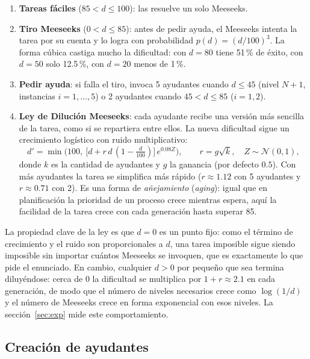 \documentclass[11pt,letterpaper]{article}
\makeatletter
\newcommand{\codigo}[2]{%
  \edef\lin{\csname line@#1\endcsname}%
  }
\makeatother
\begin{document}
\begin{enumerate}[leftmargin=1.5em]
\item \textbf{Tareas fáciles} ($85<d\le100$): las resuelve un solo Meeseeks.
\item \textbf{Tiro Meeseeks} ($0<d\le85$): antes de pedir ayuda, el Meeseeks intenta la
  tarea por su cuenta y lo logra con probabilidad $p(d)=(d/100)^3$. La forma cúbica castiga
  mucho la dificultad: con $d=80$ tiene 51\,\% de éxito, con $d=50$ solo 12.5\,\%, con
  $d=20$ menos de 1\,\%.
\item \textbf{Pedir ayuda}: si falla el tiro, invoca 5 ayudantes cuando $d\le45$ (nivel
  $N+1$, instancias $i=1,\dots,5$) o 2 ayudantes cuando $45<d\le85$ ($i=1,2$).
\item \textbf{Ley de Dilución Meeseeks}: cada ayudante recibe una versión más sencilla de
  la tarea, como si se repartiera entre ellos. La nueva dificultad sigue un crecimiento
  logístico con ruido multiplicativo:
  \[
    d' = \min\!\Big(100,\ \big[d + r\,d\,(1-\tfrac{d}{100})\big]\,e^{0.08Z}\Big),
    \qquad r = g\sqrt{k},\quad Z\sim\mathcal{N}(0,1),
  \]
  donde $k$ es la cantidad de ayudantes y $g$ la ganancia (por defecto $0.5$). Con más
  ayudantes la tarea se simplifica más rápido ($r\approx1.12$ con 5 ayudantes y
  $r\approx0.71$ con 2). Es una forma de \emph{añejamiento} (\emph{aging}): igual que en
  planificación la prioridad de un proceso crece mientras espera, aquí la facilidad de la
  tarea crece con cada generación hasta superar 85.
\end{enumerate}

La propiedad clave de la ley es que $d=0$ es un punto fijo: como el término de crecimiento
y el ruido son proporcionales a $d$, una tarea imposible sigue siendo imposible sin
importar cuántos Meeseeks se invoquen, que es exactamente lo que pide el enunciado. En
cambio, cualquier $d>0$ por pequeño que sea termina diluyéndose: cerca de 0 la dificultad
se multiplica por $1+r\approx2.1$ en cada generación, de modo que el número de niveles
necesarios crece como $\log(1/d)$ y el número de Meeseeks crece en forma exponencial con
esos niveles. La sección~\ref{sec:exp} mide este comportamiento.

\codigo{dilute}{Ley de Dilución Meeseeks}
\codigo{selfp}{Probabilidad del Tiro Meeseeks}

\subsection{Creación de ayudantes}
\end{document}
